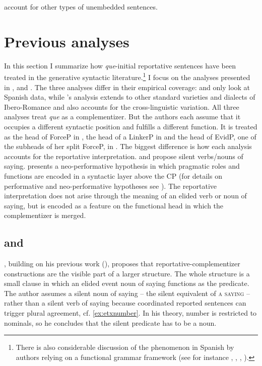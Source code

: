 account for other types of unembedded sentences.

\section{Previous analyses}\label{sec:insubexistan}\largerpage[2]

\begin{sloppypar}
In this section I summarize how \emph{que}-initial reportative sentences have been treated in the generative syntactic literature.\footnote{There is also considerable discussion of the phenomenon in Spanish by authors relying on a functional grammar framework (see for instance \citealt{Ballesteros2000}, \citealt{PonsBorderia2003},  \citealt{Gras2010, Gras2016},  \citealt{Sansinenaetal2015}).}  I focus on the analyses presented in \citet{Corr2016}, \citet{Etxepare2007,Etxepare2010,Etxepare2013} and \citet{DemonteSoriano2014}. The three analyses  differ in their empirical coverage: \citet{Etxepare2013} and \citet{DemonteSoriano2014} only look at Spanish data, while \citeauthor{Corr2016}'s analysis extends to other standard varieties and dialects of Ibero-Romance  and also accounts for the cross-linguistic variation. All three analyses treat \emph{que} as a complementizer. But the authors each assume that it occupies a different  syntactic position and fulfills a different function. It is treated as the head of ForceP in \citet{DemonteSoriano2014}, the head of a LinkerP in \citet{Etxepare2013} and the head of EvidP, one of the subheads of her split ForceP,  in \citet{Corr2016}. The biggest difference is how each analysis accounts for the reportative interpretation. \citet{Etxepare2013} and \citet{DemonteSoriano2014} propose silent verbs/nouns of saying. \citet{Corr2016} presents a neo-performative hypothesis  in which pragmatic roles and functions are encoded in a syntactic layer above the CP (for details on performative and neo-performative hypotheses see ). The reportative interpretation does not arise through the meaning of an  elided verb or noun of saying, but is encoded as a feature on the functional head in which the complementizer is merged. 
\end{sloppypar}

\subsection{\citet{Etxepare2013} and \citet{DemonteSoriano2014}}


\citet{Etxepare2013}, building on his previous work (\citeyear{Etxepare2007,Etxepare2010}), proposes that re\-por\-ta\-tive-com\-ple\-men\-ti\-zer constructions are the visible part of a larger structure. The whole structure is a small clause in which an elided event noun of saying functions as the predicate.  The author assumes a silent noun of saying -- the silent equivalent of \textsc{a saying} -- rather than a silent verb of saying because coordinated reported sentences can trigger plural  agreement, cf. \eqref{ex:etxnumber}. In his theory,  number is restricted to nominals, so  he concludes that the silent predicate has to be a noun.

